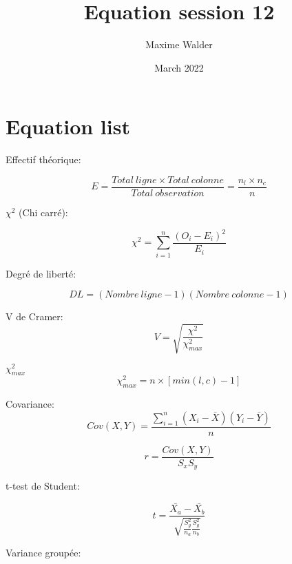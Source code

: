 \documentclass{article}
\title{Equation session 12}
\author{Maxime Walder}
\date{March 2022}
\begin{document}
\maketitle

\section{Equation list}

\bigskip

Effectif théorique: 

\begin{equation}
    E = \frac{Total\:ligne \times Total\:colonne}{Total\:observation} = \frac{n_l \times n_c}{n}
\end{equation}

\bigskip

$\chi^2$ (Chi carré):\par
\begin{equation}
    \chi^2 = \sum_{i=1}^{n} \frac{(O_i - E_i)^2}{E_i} 
\end{equation}


Degré de liberté: \par
\begin{equation}
    DL = (Nombre\:ligne - 1)(Nombre\:colonne - 1) 
\end{equation}

V de Cramer:
\begin{equation}
    V = \sqrt{\frac{\chi^2}{\chi^2_{max}}}
\end{equation}

$\chi^2_{max}$
\begin{equation}
    \chi^2_{max} = n \times [min(l,c) - 1]
\end{equation}

\bigskip
Covariance:
\begin{equation}
    Cov(X,Y) = \frac{\sum_{i=1}^{n} (X_i - \bar{X}) (Y_i - \bar{Y})}{n}  
\end{equation}


\bigskip

\begin{equation}
    r = \frac{Cov(X,Y)}{S_x S_y}
\end{equation}

t-test de Student:

\begin{equation}
    t = \frac{\bar{X_a} - \bar{X_b}}{\sqrt{\frac{S_g^2}{n_a}\frac{S_g^2}{n_b}}}
\end{equation}


\bigskip
Variance groupée:
\end{document}
